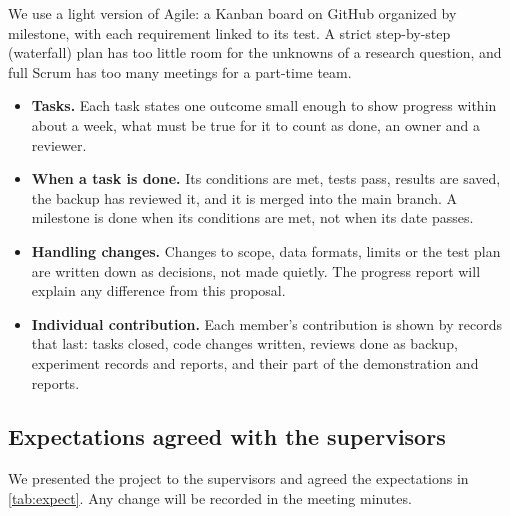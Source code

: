\documentclass[11pt,letterpaper]{article}
\begin{document}
We use a light version of Agile: a Kanban board on GitHub organized by milestone, with
each requirement linked to its test. A strict step-by-step (waterfall) plan has too little
room for the unknowns of a research question, and full Scrum has too many meetings for a
part-time team.
\begin{itemize}
\item \textbf{Tasks.} Each task states one outcome small enough to show progress within
about a week, what must be true for it to count as done, an owner and a reviewer.
\item \textbf{When a task is done.} Its conditions are met, tests pass, results are saved,
the backup has reviewed it, and it is merged into the main branch. A milestone is done
when its conditions are met, not when its date passes.
\item \textbf{Handling changes.} Changes to scope, data formats, limits or the test plan
are written down as decisions, not made quietly. The progress report will explain any
difference from this proposal.
\item \textbf{Individual contribution.} Each member's contribution is shown by records
that last: tasks closed, code changes written, reviews done as backup, experiment records
and reports, and their part of the demonstration and reports.
\end{itemize}

\subsection{Expectations agreed with the supervisors}

We presented the project to the supervisors and agreed the expectations in
\cref{tab:expect}. Any change will be recorded in the meeting minutes.
\end{document}
